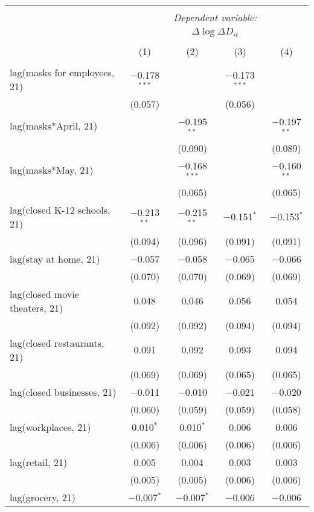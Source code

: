 \begin{tabular}{@{\extracolsep{1pt}}lcccc} 
\\[-1.8ex]\hline 
\hline \\[-1.8ex] 
 & \multicolumn{4}{c}{\textit{Dependent variable:}} \\ 
\cline{2-5} 
 & \multicolumn{4}{c}{$\Delta \log \Delta D_{it}$} \\ 
\\[-1.8ex] & (1) & (2) & (3) & (4)\\ 
\hline \\[-1.8ex] 
 lag(masks for employees, 21) & $-$0.178$^{***}$ &  & $-$0.173$^{***}$ &  \\ 
  & (0.057) &  & (0.056) &  \\ 
  lag(masks*April, 21) &  & $-$0.195$^{**}$ &  & $-$0.197$^{**}$ \\ 
  &  & (0.090) &  & (0.089) \\ 
  lag(masks*May, 21) &  & $-$0.168$^{***}$ &  & $-$0.160$^{**}$ \\ 
  &  & (0.065) &  & (0.065) \\ 
  lag(closed K-12 schools, 21) & $-$0.213$^{**}$ & $-$0.215$^{**}$ & $-$0.151$^{*}$ & $-$0.153$^{*}$ \\ 
  & (0.094) & (0.096) & (0.091) & (0.091) \\ 
  lag(stay at home, 21) & $-$0.057 & $-$0.058 & $-$0.065 & $-$0.066 \\ 
  & (0.070) & (0.070) & (0.069) & (0.069) \\ 
  lag(closed movie theaters, 21) & 0.048 & 0.046 & 0.056 & 0.054 \\ 
  & (0.092) & (0.092) & (0.094) & (0.094) \\ 
  lag(closed restaurants, 21) & 0.091 & 0.092 & 0.093 & 0.094 \\ 
  & (0.069) & (0.069) & (0.065) & (0.065) \\ 
  lag(closed businesses, 21) & $-$0.011 & $-$0.010 & $-$0.021 & $-$0.020 \\ 
  & (0.060) & (0.059) & (0.059) & (0.058) \\ 
  lag(workplaces, 21) & 0.010$^{*}$ & 0.010$^{*}$ & 0.006 & 0.006 \\ 
  & (0.006) & (0.006) & (0.006) & (0.006) \\ 
  lag(retail, 21) & 0.005 & 0.004 & 0.003 & 0.003 \\ 
  & (0.005) & (0.005) & (0.006) & (0.006) \\ 
  lag(grocery, 21) & $-$0.007$^{*}$ & $-$0.007$^{*}$ & $-$0.006 & $-$0.006 \\ 

\end{tabular}
